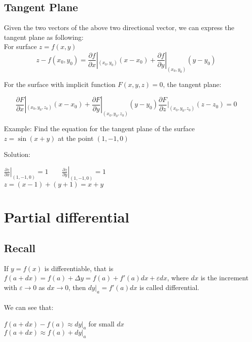\subsection{Tangent Plane}
Given the two vectors of the above two directional vector, we can express the tangent plane as following: \\

For surface $z=f(x,y)$
\begin{equation}
\boxed{z-f(x_0,y_0)=\frac{\partial f}{\partial x}|_{(x_0,y_0)}(x-x_0)+\frac{\partial f}{\partial y}|_{(x_0,y_0)}(y-y_0)}
\end{equation}

For the surface with implicit function $F(x,y,z)=0$, the tangent plane:

\begin{equation}
\boxed{\frac{\partial F}{\partial x}|_{(x_0,y_0,z_0)}(x-x_0)+\frac{\partial F}{\partial y}|_{(x_0,y_0,z_0)}(y-y_0)\frac{\partial F}{\partial z}|_{(x_0,y_0,z_0)}(z-z_0)=0}
\end{equation}

Example: Find the equation for the tangent plane of the surface $z=\sin (x+y)$ at the point $(1,-1,0)$

Solution:
\begin{center}
$\left. \frac{\partial z}{\partial x} \right|_{(1,-1,0)}=1 \qquad \left. \frac{\partial z}{\partial y} \right|_{(1,-1,0)}=1$\\
$z=(x-1)+(y+1)=x+y$
\end{center}

\section{Partial differential}
\subsection{Recall}
If $y=f(x)$ is differentiable, that is $f(a+dx)=f(a)+\Delta y=f(a)+f'(a)dx+\varepsilon dx$, where $dx$ is the increment with $\varepsilon \to 0$ as $dx \to 0$, then $dy|_{a}=f'(a)dx$ is called differential.\\ \\

We can see that:

\begin{center}
$f(a+dx)-f(a)\approx dy|_{a}$ for small $dx$\\
$f(a+dx)\approx f(a)+dy|_{a}$
\end{center}

